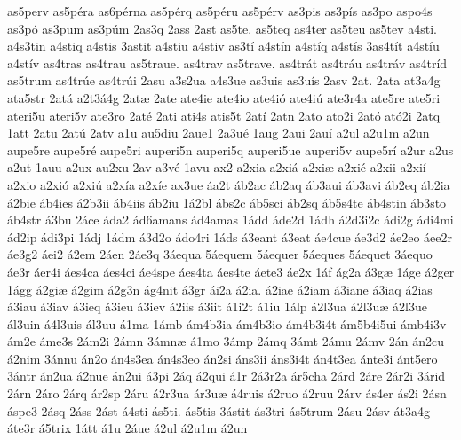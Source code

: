 {as5perv
as5p^^e9ra
as6p^^e9rna
as5p^^e9rq
as5p^^e9ru
as5p^^e9rv
as3pis
as3p^^eds
as3po
aspo4s
as3p^^f3
as3pum
as3p^^fam
2as3q
2ass
2ast
as5te.
as5teq
as4ter
as5teu
as5tev
a4sti.
a4s3tin
a4stiq
a4stis
3astit
a4stiu
a4stiv
as3t^^ed
a4st^^edn
a4st^^edq
a4st^^eds
3as4t^^edt
a4st^^edu
a4st^^edv
as4tras
as4trau
as5traue.
as4trav
as5trave.
as4tr^^e1t
as4tr^^e1u
as4tr^^e1v
as4tr^^edd
as5trum
as4tr^^fae
as4tr^^fai
2asu
a3s2ua
a4s3ue
as3uis
as3u^^eds
2asv
2at.
2ata
at3a4g
ata5str
2at^^e1
a2t3^^e14g
2at^^e6
2ate
ate4ie
ate4io
ate4i^^f3
ate4i^^fa
ate3r4a
ate5re
ate5ri
ateri5u
ateri5v
ate3ro
2at^^e9
2ati
ati4s
atis5t
2at^^ed
2atn
2ato
ato2i
2at^^f3
at^^f32i
2atq
1att
2atu
2at^^fa
2atv
a1u
au5diu
2aue1
2a3u^^e9
1aug
2aui
2au^^ed
a2ul
a2u1m
a2un
aupe5re
aupe5r^^e9
aupe5ri
auperi5n
auperi5q
auperi5ue
auperi5v
aupe5r^^ed
a2ur
a2us
a2ut
1auu
a2ux
au2xu
2av
a3v^^e9
1avu
ax2
a2xia
a2xi^^e1
a2xi^^e6
a2xi^^e9
a2xii
a2xi^^ed
a2xio
a2xi^^f3
a2xi^^fa
a2x^^eda
a2x^^ede
ax3ue
^^e1a2t
^^e1b2ac
^^e1b2aq
^^e1b3aui
^^e1b3avi
^^e1b2eq
^^e1b2ia
^^e12bie
^^e1b4ies
^^e12b3ii
^^e1b4iis
^^e1b2iu
1^^e12bl
^^e1bs2c
^^e1b5sci
^^e1b2sq
^^e1b5s4te
^^e1b4stin
^^e1b3sto
^^e1b4str
^^e13bu
2^^e1ce
^^e1da2
^^e1d6amans
^^e1d4amas
1^^e1dd
^^e1de2d
1^^e1dh
^^e12d3i2c
^^e1di2g
^^e1di4mi
^^e1d2ip
^^e1di3pi
1^^e1dj
1^^e1dm
^^e13d2o
^^e1do4ri
1^^e1ds
^^e13eant
^^e13eat
^^e1e4cue
^^e1e3d2
^^e1e2eo
^^e1ee2r
^^e1e3g2
^^e1ei2
^^e12em
2^^e1en
2^^e1e3q
3^^e1equa
5^^e1equem
5^^e1equer
5^^e1eques
5^^e1equet
3^^e1equo
^^e1e3r
^^e1er4i
^^e1es4ca
^^e1es4ci
^^e1e4spe
^^e1es4ta
^^e1es4te
^^e1ete3
^^e1e2x
1^^e1f
^^e1g2a
^^e13g^^e6
1^^e1ge
^^e12ger
1^^e1gg
^^e12gi^^e6
^^e12gim
^^e12g3n
^^e1g4nit
^^e13gr
^^e1i2a
^^e12ia.
^^e12iae
^^e12iam
^^e13iane
^^e13iaq
^^e12ias
^^e13iau
^^e13iav
^^e13ieq
^^e13ieu
^^e13iev
^^e12iis
^^e13iit
^^e11i2t
^^e11iu
1^^e1lp
^^e12l3ua
^^e12l3u^^e6
^^e12l3ue
^^e1l3uin
^^e14l3uis
^^e1l3uu
^^e11ma
1^^e1mb
^^e1m4b3ia
^^e1m4b3io
^^e1m4b3i4t
^^e1m5b4i5ui
^^e1mb4i3v
^^e1m2e
^^e1me3s
2^^e1m2i
2^^e1mn
3^^e1mn^^e6
^^e11mo
3^^e1mp
2^^e1mq
3^^e1mt
2^^e1mu
2^^e1mv
2^^e1n
^^e1n2cu
^^e12nim
3^^e1nnu
^^e1n2o
^^e1n4s3ea
^^e1n4s3eo
^^e1n2si
^^e1ns3ii
^^e1ns3i4t
^^e1n4t3ea
^^e1nte3i
^^e1nt5ero
3^^e1ntr
^^e1n2ua
^^e12nue
^^e1n2ui
^^e13pi
2^^e1q
^^e12qui
^^e11r
2^^e13r2a
^^e1r5cha
2^^e1rd
2^^e1re
2^^e1r2i
3^^e1rid
2^^e1rn
2^^e1ro
2^^e1rq
^^e1r2sp
2^^e1ru
^^e12r3ua
^^e1r3u^^e6
^^e14ruis
^^e12ruo
^^e12ruu
2^^e1rv
^^e1s4er
^^e1s2i
2^^e1sn
^^e1spe3
2^^e1sq
2^^e1ss
2^^e1st
^^e14sti
^^e1s5ti.
^^e1s5tis
3^^e1stit
^^e1s3tri
^^e1s5trum
2^^e1su
2^^e1sv
^^e1t3a4g
^^e1te3r
^^e15trix
1^^e1tt
^^e11u
2^^e1ue
^^e12ul
^^e12u1m
^^e12un
}
